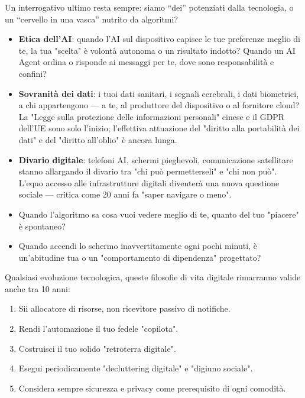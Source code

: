 
Un interrogativo ultimo resta sempre: siamo “dei” potenziati dalla tecnologia, o un “cervello in una vasca” nutrito da algoritmi?

\begin{itemize}
  \item \textbf{Etica dell'AI}: quando l'AI sul dispositivo capisce le tue preferenze meglio di te, la tua "scelta" è volontà autonoma o un risultato indotto? Quando un AI Agent ordina o risponde ai messaggi per te, dove sono responsabilità e confini?
  \item \textbf{Sovranità dei dati}: i tuoi dati sanitari, i segnali cerebrali, i dati biometrici, a chi appartengono — a te, al produttore del dispositivo o al fornitore cloud? La "Legge sulla protezione delle informazioni personali" cinese e il GDPR dell'UE sono solo l'inizio; l'effettiva attuazione del "diritto alla portabilità dei dati" e del "diritto all'oblio" è ancora lunga.
  \item \textbf{Divario digitale}: telefoni AI, schermi pieghevoli, comunicazione satellitare stanno allargando il divario tra "chi può permetterseli" e "chi non può". L'equo accesso alle infrastrutture digitali diventerà una nuova questione sociale — critica come 20 anni fa "saper navigare o meno".
  \item Quando l'algoritmo sa cosa vuoi vedere meglio di te, quanto del tuo "piacere" è spontaneo?
  \item Quando accendi lo schermo inavvertitamente ogni pochi minuti, è un'abitudine tua o un "comportamento di dipendenza" progettato?
\end{itemize}


Qualsiasi evoluzione tecnologica, queste filosofie di vita digitale rimarranno valide anche tra 10 anni:

\begin{enumerate}
  \item Sii allocatore di risorse, non ricevitore passivo di notifiche.
  \item Rendi l'automazione il tuo fedele "copilota".
  \item Costruisci il tuo solido "retroterra digitale".
  \item Esegui periodicamente "decluttering digitale" e "digiuno sociale".
  \item Considera sempre sicurezza e privacy come prerequisito di ogni comodità.
\end{enumerate}

